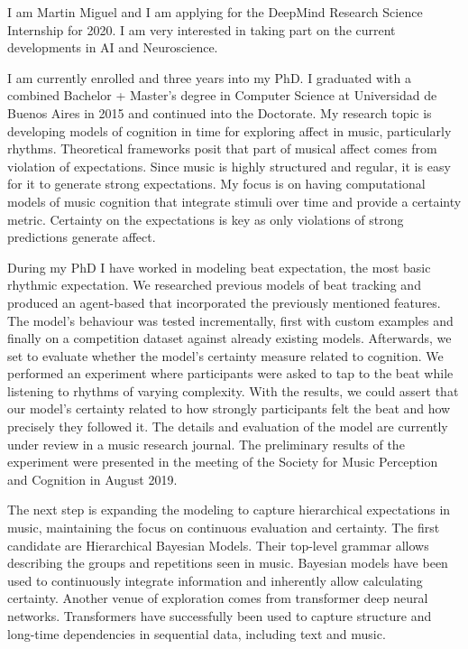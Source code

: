 I am Martin Miguel and I am applying for the DeepMind Research Science
Internship for 2020. I am very interested in taking part on the current
developments in AI and Neuroscience. 

I am currently enrolled and three years into my PhD. I graduated with a
combined Bachelor + Master's degree in Computer Science at Universidad de
Buenos Aires in 2015 and continued into the Doctorate. My research topic is
developing models of cognition in time for exploring affect in music,
particularly rhythms. Theoretical frameworks posit that part of musical affect
comes from violation of expectations. Since music is highly structured and
regular, it is easy for it to generate strong expectations. My focus is on
having computational models of music cognition that integrate stimuli over time
and provide a certainty metric. Certainty on the expectations is key as only
violations of strong predictions generate affect.

During my PhD I have worked in modeling beat expectation, the most basic
rhythmic expectation. We researched previous models of beat tracking and 
produced an agent-based that incorporated the previously mentioned features.  
The model's behaviour was tested incrementally, first with custom examples and
finally on a competition dataset against already existing models.
Afterwards, we set to evaluate whether the model's certainty measure related to
cognition. We performed an experiment where participants were asked to tap to
the beat while listening to rhythms of varying complexity. With the results, we
could assert that our model's certainty related to how strongly participants
felt the beat and how precisely they followed it. The details and evaluation of
the model are currently under review in a music research journal. The
preliminary results of the experiment were presented in the meeting of the
Society for Music Perception and Cognition in August 2019. 

The next step is expanding the modeling to capture hierarchical expectations in
music, maintaining the focus on continuous evaluation and certainty. The first
candidate are Hierarchical Bayesian Models. Their top-level grammar allows
describing the groups and repetitions seen in music.  Bayesian models have been
used to continuously integrate information and inherently allow calculating
certainty. Another venue of exploration comes from transformer deep neural
networks. Transformers have successfully been used to capture structure and
long-time dependencies in sequential data, including text and music. 

